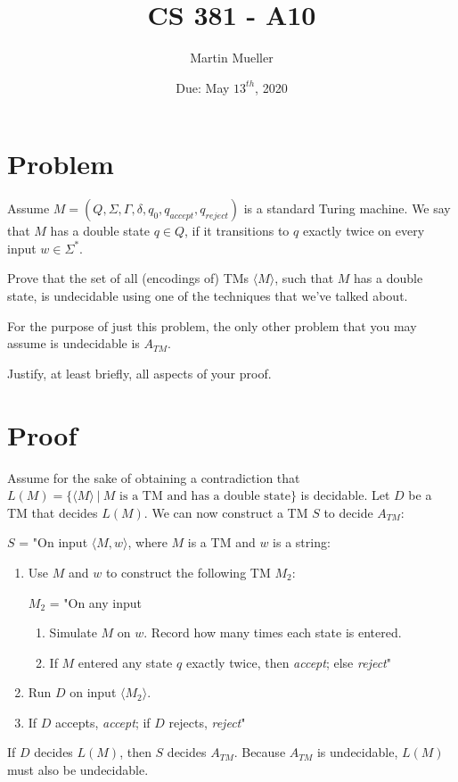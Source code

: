 \documentclass[11pt letter]{article}
\title{CS 381 - A10}
\author{Martin Mueller}
\date{Due: May $13^{th}$, 2020}
\begin{document}
\maketitle
\section{Problem}
Assume $M=\left(Q,\Sigma,\Gamma,\delta,q_0,q_{accept},q_{reject}\right)$ is a standard Turing machine. We say that $M$ has a double state $q \in Q$, if it transitions to $q$ exactly twice on every input $w \in \Sigma^{*}$.

Prove that the set of all (encodings of) TMs $\langle M \rangle$, such that $M$ has a double state, is undecidable using one of the techniques that we've talked about.

For the purpose of just this problem, the only other problem that you may assume is undecidable is $A_{TM}$. 

Justify, at least briefly, all aspects of your proof.
\section{Proof}
Assume for the sake of obtaining a contradiction that $L(M) = \{ \langle M \rangle \ | \ M \text{ is a TM and has a double state}\}$ is decidable. Let $D$ be a TM that decides $L(M)$. We can now construct a TM $S$ to decide $A_{TM}$:

$S$ = "On input $\langle M, w \rangle$, where $M$ is a TM and $w$ is a string:
\begin{enumerate}
    \item Use $M$ and $w$ to construct the following TM $M_{2}$:
    
    $M_{2}$ = "On any input
    \begin{enumerate}
        \item Simulate $M$ on $w$. Record how many times each state is entered.
        \item If $M$ entered any state $q$ exactly twice, then \textit{accept}; else \textit{reject}"
    \end{enumerate}
    \item Run $D$ on input $\langle M_{2} \rangle$.
    \item If $D$ accepts, \textit{accept}; if $D$ rejects, \textit{reject}"
\end{enumerate}
If $D$ decides $L(M)$, then $S$ decides $A_{TM}$. Because $A_{TM}$ is undecidable, $L(M)$ must also be undecidable.
\end{document}
